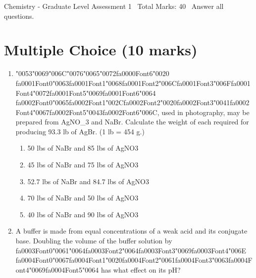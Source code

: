 \documentclass[12pt]{article}
\begin{document}
\begin{center}
Chemistry - Graduate Level Assessment 1 \
Total Marks: 40 \
Answer all questions.
\end{center}

\section*{Multiple Choice (10 marks)}
\begin{enumerate}[label=\arabic*.]
\item {\char"0053}{\char"0069}{\char"006C}{\char"0076}{\char"0065}{\char"0072}{\csname fa0000Font6\endcsname\char"0020} {\csname fa0001Font0\endcsname\char"0063}{\csname fa0001Font1\endcsname\char"0068}{\csname fa0001Font2\endcsname\char"006C}{\csname fa0001Font3\endcsname\char"006F}{\csname fa0001Font4\endcsname\char"0072}{\csname fa0001Font5\endcsname\char"0069}{\csname fa0001Font6\endcsname\char"0064} {\csname fa0002Font0\endcsname\char"0065}{\csname fa0002Font1\endcsname\char"002C}{\csname fa0002Font2\endcsname\char"0020}{\csname fa0002Font3\endcsname\char"0041}{\csname fa0002Font4\endcsname\char"0067}{\csname fa0002Font5\endcsname\char"0043}{\csname fa0002Font6\endcsname\char"006C}, used in photography, may be prepared from AgNO\_3 and NaBr. Calculate
the weight of each required for producing 93.3 lb of AgBr. (1 lb = 454 g.)
\begin{enumerate}[label=(\alph*)]
    \item 50 lbs of NaBr and 85 lbs of AgNO3
    \item 45 lbs of NaBr and 75 lbs of AgNO3
    \item 52.7 lbs of NaBr and 84.7 lbs of AgNO3
    \item 70 lbs of NaBr and 50 lbs of AgNO3
    \item 40 lbs of NaBr and 90 lbs of AgNO3
\end{enumerate}
\item A buffer is made from equal concentrations of a weak acid and its conjugate base. Doubling
the volume of the buffer solution by {\csname fa0003Font0\endcsname\char"0061}{\char"0064}{\csname fa0003Font2\endcsname\char"0064}{\csname fa0003Font3\endcsname\char"0069}{\csname fa0003Font4\endcsname\char"006E} {\csname fa0004Font0\endcsname\char"0067}{\csname fa0004Font1\endcsname\char"0020}{\csname fa0004Font2\endcsname\char"0061}{\csname fa0004Font3\endcsname\char"0063}{\csname fa0004Font4\endcsname\char"0069}{\csname fa0004Font5\endcsname\char"0064} has what effect on its pH?
\begin{enumerate}[label=(\alph*)]

\end{enumerate}
\end{enumerate}
\end{document}

